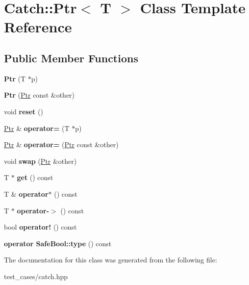 \hypertarget{classCatch_1_1Ptr}{}\section{Catch\+:\+:Ptr$<$ T $>$ Class Template Reference}
\label{classCatch_1_1Ptr}
\subsection*{Public Member Functions}
\begin{DoxyCompactItemize}
\item 
\mbox{\label{classCatch_1_1Ptr_aacec063a79cd142e39040a31c6b3c40b}} 
{\bfseries Ptr} (T $\ast$p)
\item 
\mbox{\label{classCatch_1_1Ptr_ac629dd8ebe5763a37bb89e6c1d6a1771}} 
{\bfseries Ptr} (\hyperlink{classCatch_1_1Ptr}{Ptr} const \&other)
\item 
\mbox{\label{classCatch_1_1Ptr_af8d0fa7a2cd20842830b354ac31dfe5c}} 
void {\bfseries reset} ()
\item 
\mbox{\label{classCatch_1_1Ptr_a9b08c868b447d679ed201921f5c94683}} 
\hyperlink{classCatch_1_1Ptr}{Ptr} \& {\bfseries operator=} (T $\ast$p)
\item 
\mbox{\label{classCatch_1_1Ptr_af42074444c1bc6a70ebdc406a8617708}} 
\hyperlink{classCatch_1_1Ptr}{Ptr} \& {\bfseries operator=} (\hyperlink{classCatch_1_1Ptr}{Ptr} const \&other)
\item 
\mbox{\label{classCatch_1_1Ptr_a172bf8b4e71e26a5a4d92f5b02158b50}} 
void {\bfseries swap} (\hyperlink{classCatch_1_1Ptr}{Ptr} \&other)
\item 
\mbox{\label{classCatch_1_1Ptr_a2158bb2a1a21b001a2e72d4591d3e31e}} 
T $\ast$ {\bfseries get} () const
\item 
\mbox{\label{classCatch_1_1Ptr_a8d73989b1c77a1cab6152766feaa837f}} 
T \& {\bfseries operator$\ast$} () const
\item 
\mbox{\label{classCatch_1_1Ptr_acc0996cbd99f360069260a898b3f4fda}} 
T $\ast$ {\bfseries operator-\/$>$} () const
\item 
\mbox{\label{classCatch_1_1Ptr_a85c4fe6cebf2a69d0416020b65714360}} 
bool {\bfseries operator!} () const
\item 
\mbox{\label{classCatch_1_1Ptr_a102838cb25643586679e12efca26a3af}} 
{\bfseries operator Safe\+Bool\+::type} () const
\end{DoxyCompactItemize}


The documentation for this class was generated from the following file\+:\begin{DoxyCompactItemize}
\item 
test\+\_\+cases/catch.\+hpp\end{DoxyCompactItemize}
